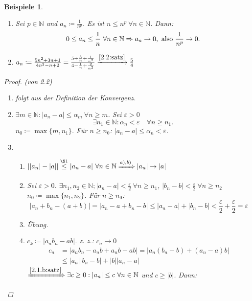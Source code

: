 \documentclass{extreport}
\newcommand{\N}{\mathbb{N}}
\theoremstyle{named}
\theoremstyle{dotless}
\newtheorem*{beispiele}{Beispiele}
\begin{document}
\begin{beispiele} \
	\begin{enumerate}
		\item Sei $p \in \N$ und $a_{n} \coloneqq \frac{1}{n^{p}}$. Es ist $n \leq n^{p} ~\forall n \in \N$. Dann: 
			$$ 0 \leq a_{n} \leq \frac{1}{n} ~\forall n \in \N \xRightarrow[]{\label{2.2.e:satz}} a_{n} \rightarrow 0, \text{ also } \frac{1}{n^{p}} \rightarrow 0. $$
		\item $a_{n} \coloneqq \frac{5n^{2} + 3n + 1}{4n^{2} - n + 2} = \frac{5 + \frac{3}{n} + \frac{1}{n^{2}}}{4 - \frac{1}{n} + \frac{2}{n^{2}}} \xrightarrow[]{\ref{2.2:satz}} \frac{5}{4}$
	\end{enumerate}
	
	\begin{proof}(von 2.2) ~\
		\begin{enumerate}
			\item folgt aus der Definition der Konvergenz.
			\item $\exists m \in \N: |a_{n} - a | \leq \alpha_{m} ~\forall n \geq m$. Sei $\varepsilon > 0$
				$$
		 		\exists n_{1} \in \N: \alpha_{n} < \varepsilon \quad \forall n \geq n_{1}.
		 		$$
		 		$n_{0} \coloneqq \max \{ m , n_{1} \}$. Für $n \geq n_{0}$: $|a_{n} - a| \leq \alpha_{n} < \varepsilon$.
			\item \begin{enumerate}
				\item $| |a_{n}| - |a|| \overset{\S 1}{\leq} |a_{n} - a| ~\forall n \in \N \xRightarrow[]{a), b)} |a_{n}| \rightarrow |a|$
				\item Sei $\varepsilon > 0$. $\exists n_{1}, n_{2} \in \N; |a_{n} - a| < \frac{\varepsilon}{2} ~\forall n \geq n_{1}$, $|b_{n} - b| < \frac{\varepsilon}{2} ~\forall n \geq n_{2}$ \\
					$n_{0} \coloneqq \max \{ n_{1}, n_{2} \}$. Für $n \geq n_{0}$:
					$$
						|a_{n} + b_{n} - (a + b)| = |a_{n} - a + b_{n} - b| \leq |a_{n} - a| + |b_{n} - b| < \frac{\varepsilon}{2} + \frac{\varepsilon}{2} = \varepsilon
					$$
				\item Übung.
				\item $c_{k} \coloneqq |a_{n} b_{n} - ab|$. z. z.: $c_{n} \rightarrow 0$
					\begin{align*}
						c_{n} & = |a_{n}b_{n} - a_{n}b + a_{n}b - ab| = |a_{n}(b_{n} - b)+ (a_{n} - a)b| \\
							  & \leq |a_{n}||b_{n} - b| + |b||a_{n}-a|
					\end{align*}
					$\xRightarrow[]{\ref{2.1.b:satz}} \exists c \geq 0 : |a_{n}| \leq c ~\forall n \in \N$ und $c \geq |b|$. Dann:

\end{enumerate}
\end{enumerate}
\end{proof}
\end{beispiele}
\end{document}
